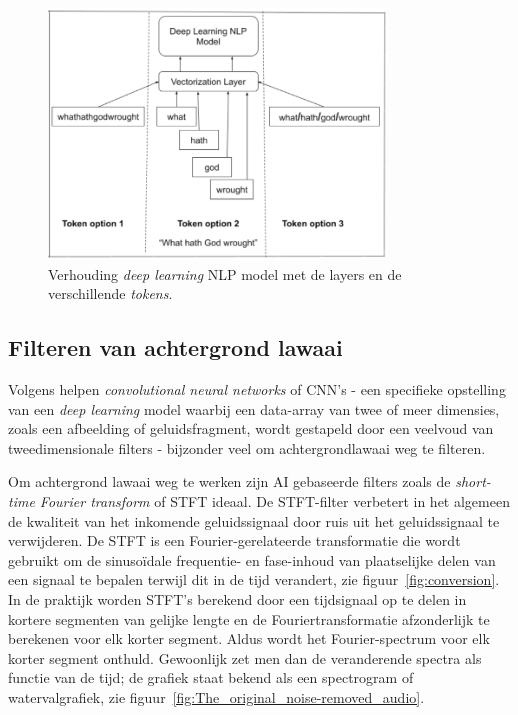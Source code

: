 \begin{figure}
    \centering
    \includegraphics[width=0.8\textwidth]{./img/tokenization-1}
    \caption{\label{fig:tokens_verhouding_dl}Verhouding \textit{deep learning} NLP model met de layers en de verschillende \textit{tokens}.~\autocite{Horan2020}}
\end{figure}


\subsection{Filteren van achtergrond lawaai}
Volgens \textcite{Jung2021} helpen \textit{convolutional neural networks} of CNN's - een specifieke opstelling van een \textit{deep learning} model waarbij een
data-array van twee of meer dimensies, zoals een afbeelding of geluidsfragment, wordt gestapeld door een veelvoud van tweedimensionale filters - bijzonder veel om achtergrondlawaai weg te filteren.

Om achtergrond lawaai weg te werken zijn AI gebaseerde filters zoals de \textit{short-time Fourier transform} of STFT ideaal. De STFT-filter verbetert in het algemeen de kwaliteit van het inkomende geluidssignaal door ruis uit het geluidssignaal te verwijderen.
De STFT is een Fourier-gerelateerde transformatie die wordt gebruikt om de sinusoïdale frequentie- en fase-inhoud van plaatselijke delen van een signaal te bepalen terwijl dit in de tijd verandert, zie figuur~\ref{fig:conversion}. In de praktijk worden STFT's berekend door een tijdsignaal op te delen in kortere segmenten van gelijke lengte en de Fouriertransformatie afzonderlijk te berekenen voor elk korter segment. Aldus wordt het Fourier-spectrum voor elk korter segment onthuld. Gewoonlijk zet men dan de veranderende spectra als functie van de tijd; de grafiek staat bekend als een spectrogram of watervalgrafiek, zie figuur~\ref{fig:The_original_noise-removed_audio}.~\autocite{Jung2021}

